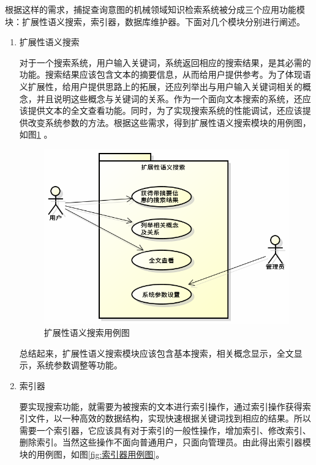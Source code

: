\documentclass[12pt,a4paper]{article}
\newcommand{\wuhao}{\fontsize{10.5pt}{\baselineskip}\selectfont}
\begin{document}
	根据这样的需求，捕捉查询意图的机械领域知识检索系统被分成三个应用功能模块：扩展性语义搜索，索引器，数据库维护器。下面对几个模块分别进行阐述。
	\begin{enumerate}[(1)]
	\item 扩展性语义搜索
	
	对于一个搜索系统，用户输入关键词，系统返回相应的搜索结果，是其必需的功能。搜索结果应该包含文本的摘要信息，从而给用户提供参考。为了体现语义扩展性，给用户提供思路上的拓展，还应列举出与用户输入关键词相关的概念，并且说明这些概念与关键词的关系。作为一个面向文本搜索的系统，还应该提供文本的全文查看功能。同时，为了实现搜索系统的性能调试，还应该提供改变系统参数的方法。根据这些需求，得到扩展性语义搜索模块的用例图，如图\ref{fig:扩展性语义搜索用例图} 。
	
	\begin{figure}[htbp] 
	\centering\includegraphics[scale=0.4]{fig/SearchSystemUseCase.png} 
	\caption{\wuhao 扩展性语义搜索用例图}\label{fig:扩展性语义搜索用例图} 
	\end{figure} 

	总结起来，扩展性语义搜索模块应该包含基本搜索，相关概念显示，全文显示，系统参数调整等功能。
	
	\item 索引器
	
	要实现搜索功能，就需要为被搜索的文本进行索引操作，通过索引操作获得索引文件，以一种高效的数据结构，实现快速根据关键词找到相应的结果。所以需要一个索引器，它应该具有对于索引的一般性操作，增加索引、修改索引、删除索引。当然这些操作不面向普通用户，只面向管理员。由此得出索引器模块的用例图，如图\ref{fig:索引器用例图}。
	

\end{enumerate}
\end{document}
